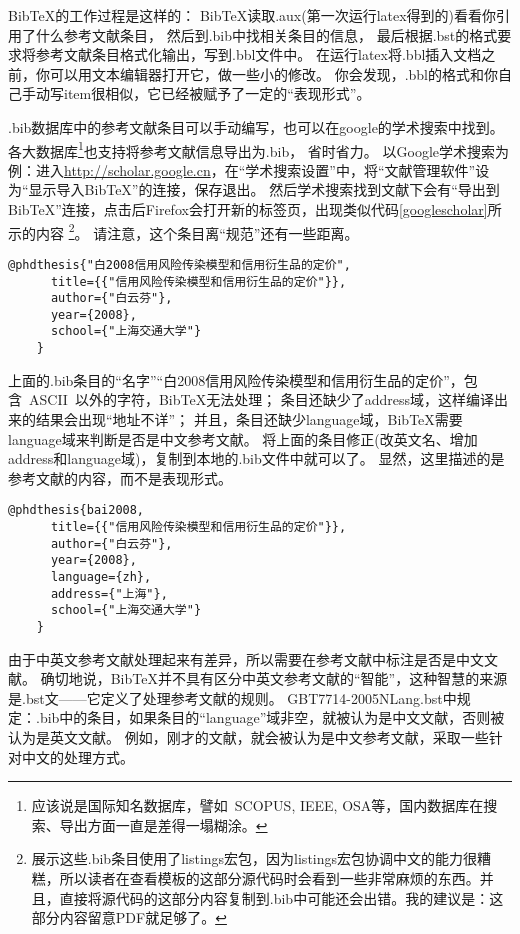 BibTeX的工作过程是这样的：
BibTeX读取.aux(第一次运行latex得到的)看看你引用了什么参考文献条目，
然后到.bib中找相关条目的信息，
最后根据.bst的格式要求将参考文献条目格式化输出，写到.bbl文件中。
在运行latex将.bbl插入文档之前，你可以用文本编辑器打开它，做一些小的修改。
你会发现，.bbl的格式和你自己手动写item很相似，它已经被赋予了一定的``表现形式''。

.bib数据库中的参考文献条目可以手动编写，也可以在google的学术搜索中找到。
各大数据库\footnote{应该说是国际知名数据库，譬如~SCOPUS, IEEE, OSA等，国内数据库在搜索、导出方面一直是差得一塌糊涂。}也支持将参考文献信息导出为.bib，
省时省力。
以Google学术搜索为例：进入\url{http://scholar.google.cn}，在``学术搜索设置''中，将``文献管理软件''设为``显示导入BibTeX''的连接，保存退出。
然后学术搜索找到文献下会有``导出到BibTeX''连接，点击后Firefox会打开新的标签页，出现类似代码\ref{googlescholar}所示的内容
\footnote{展示这些.bib条目使用了listings宏包，因为listings宏包协调中文的能力很糟糕，所以读者在查看模板的这部分源代码时会看到一些非常麻烦的东西。并且，直接将源代码的这部分内容复制到.bib中可能还会出错。我的建议是：这部分内容留意PDF就足够了。}。
请注意，这个条目离``规范''还有一些距离。

  \begin{lstlisting}[caption={从Google Scholar找到的，但并不规范的.bib条目}, label=googlescholar, float, escapeinside="", numbers=none]
    @phdthesis{"白2008信用风险传染模型和信用衍生品的定价",
      title={{"信用风险传染模型和信用衍生品的定价"}},
      author={"白云芬"},
      year={2008},
      school={"上海交通大学"}
    } 
  \end{lstlisting}

  上面的.bib条目的``名字''\cndash{}``白2008信用风险传染模型和信用衍生品的定价''，包含~ASCII~以外的字符，BibTeX无法处理；
  条目还缺少了address域，这样编译出来的结果会出现``地址不详''；
  并且，条目还缺少language域，BibTeX需要language域来判断是否是中文参考文献。
  将上面的条目修正(改英文名、增加address和language域)，复制到本地的.bib文件中就可以了。
  显然，这里描述的是参考文献的内容，而不是表现形式。

  \begin{lstlisting}[caption={一个符合规范的.bib条目}, label=itemok, float, escapeinside="", numbers=none]
    @phdthesis{bai2008,
      title={{"信用风险传染模型和信用衍生品的定价"}},
      author={"白云芬"},
      year={2008},
      language={zh},
      address={"上海"},
      school={"上海交通大学"}
    } 
  \end{lstlisting}

由于中英文参考文献处理起来有差异，所以需要在参考文献中标注是否是中文文献。
确切地说，BibTeX并不具有区分中英文参考文献的``智能''，这种智慧的来源是.bst文——它定义了处理参考文献的规则。
GBT7714-2005NLang.bst中规定：.bib中的条目，如果条目的``language''域非空，就被认为是中文文献，否则被认为是英文文献。
例如，刚才的文献，就会被认为是中文参考文献，采取一些针对中文的处理方式。

